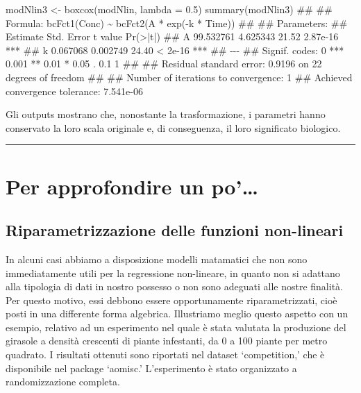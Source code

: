\documentclass[a4paper,12pt,oneside]{book}
\newenvironment{Shaded}{\begin{snugshade}}{\end{snugshade}}
\newcommand{\FloatTok}[1]{#1}
\newcommand{\DocumentationTok}[1]{#1}
\newcommand{\OtherTok}[1]{#1}
\newcommand{\FunctionTok}[1]{#1}
\newcommand{\AttributeTok}[1]{#1}
\newcommand{\NormalTok}[1]{#1}
\begin{document}
\begin{Shaded}
\begin{Highlighting}[]
\NormalTok{modNlin3 }\OtherTok{\textless{}{-}} \FunctionTok{boxcox}\NormalTok{(modNlin, }\AttributeTok{lambda =} \FloatTok{0.5}\NormalTok{)}
\FunctionTok{summary}\NormalTok{(modNlin3)}
\DocumentationTok{\#\# }
\DocumentationTok{\#\# Formula: bcFct1(Conc) \textasciitilde{} bcFct2(A * exp({-}k * Time))}
\DocumentationTok{\#\# }
\DocumentationTok{\#\# Parameters:}
\DocumentationTok{\#\#    Estimate Std. Error t value Pr(\textgreater{}|t|)    }
\DocumentationTok{\#\# A 99.532761   4.625343   21.52 2.87e{-}16 ***}
\DocumentationTok{\#\# k  0.067068   0.002749   24.40  \textless{} 2e{-}16 ***}
\DocumentationTok{\#\# {-}{-}{-}}
\DocumentationTok{\#\# Signif. codes:  0 \textquotesingle{}***\textquotesingle{} 0.001 \textquotesingle{}**\textquotesingle{} 0.01 \textquotesingle{}*\textquotesingle{} 0.05 \textquotesingle{}.\textquotesingle{} 0.1 \textquotesingle{} \textquotesingle{} 1}
\DocumentationTok{\#\# }
\DocumentationTok{\#\# Residual standard error: 0.9196 on 22 degrees of freedom}
\DocumentationTok{\#\# }
\DocumentationTok{\#\# Number of iterations to convergence: 1 }
\DocumentationTok{\#\# Achieved convergence tolerance: 7.541e{-}06}
\end{Highlighting}
\end{Shaded}

Gli outputs mostrano che, nonostante la trasformazione, i parametri hanno conservato la loro scala originale e, di conseguenza, il loro significato biologico.

\begin{center}\rule{0.5\linewidth}{0.5pt}\end{center}

\hypertarget{per-approfondire-un-po-1}{%
\section{Per approfondire un po'\ldots{}}\label{per-approfondire-un-po-1}}

\hypertarget{riparametrizzazione-delle-funzioni-non-lineari}{%
\subsection{Riparametrizzazione delle funzioni non-lineari}\label{riparametrizzazione-delle-funzioni-non-lineari}}

In alcuni casi abbiamo a disposizione modelli matamatici che non sono immediatamente utili per la regressione non-lineare, in quanto non si adattano alla tipologia di dati in nostro possesso o non sono adeguati alle nostre finalità. Per questo motivo, essi debbono essere opportunamente riparametrizzati, cioè posti in una differente forma algebrica. Illustriamo meglio questo aspetto con un esempio, relativo ad un esperimento nel quale è stata valutata la produzione del girasole a densità crescenti di piante infestanti, da 0 a 100 piante per metro quadrato. I risultati ottenuti sono riportati nel dataset `competition,' che è disponibile nel package `aomisc.' L'esperimento è stato organizzato a randomizzazione completa.
\end{document}
